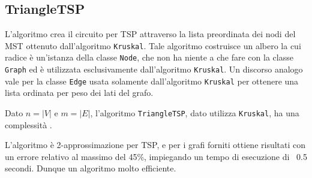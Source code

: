 \subsection{TriangleTSP}

L'algoritmo crea il circuito per TSP attraverso la lista preordinata dei nodi del MST ottenuto dall'algoritmo \texttt{Kruskal}. Tale algoritmo costruisce un albero la cui radice è un'istanza della classe \texttt{Node}, che non ha niente a che fare con la classe \texttt{Graph} ed è utilizzata esclusivamente dall'algoritmo \texttt{Kruskal}. Un discorso analogo vale per la classe \texttt{Edge} usata solamente dall'algoritmo \texttt{Kruskal} per ottenere una lista ordinata per peso dei lati del grafo.

Dato $n=|V|$ e $m=|E|$, l'algoritmo \texttt{TriangleTSP}, dato utilizza \texttt{Kruskal}, ha una complessità .

L'algoritmo è 2-approssimazione per TSP, e per i grafi forniti ottiene risultati con un errore relativo al massimo del 45\%, impiegando un tempo di esecuzione di ~0.5 secondi. Dunque un algoritmo molto efficiente.